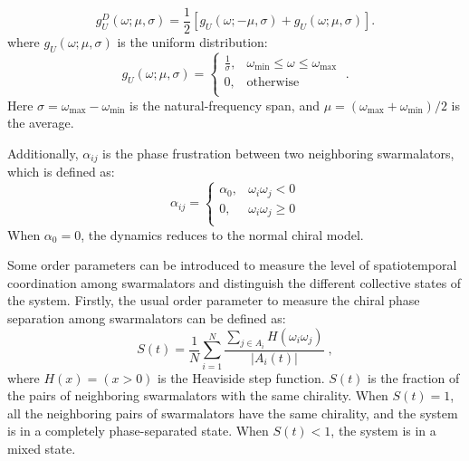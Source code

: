 \documentclass{article}
\begin{document}
\begin{equation}
    g_U^{D}\left( \omega ;\mu,\sigma\right) 
    =\frac{1}{2}\left [
    g_U\left( \omega ;-\mu,\sigma\right) + 
    g_U\left( \omega ; \mu,\sigma\right) \right ].
    \label{eq:uniform2}
\end{equation}
where $g_U\left( \omega ;\mu ,\sigma \right)$ is the uniform distribution:
\begin{equation}
    g_U\left( \omega ;\mu ,\sigma \right) =\begin{cases}
	\frac{1}{\sigma},&		\omega _{\min}\leqslant \omega \leqslant \omega _{\max}\\
	0,&		\mathrm{otherwise}\\
\end{cases}\;.
\label{eq:uniform}
\end{equation}
Here $\sigma = \omega_{\max}-\omega _{\min}$ is the natural-frequency span, and $\mu = (\omega_{\max}+\omega _{\min})/2$ is the average.

Additionally, $\alpha_{ij}$ is the phase frustration between two neighboring swarmalators, which is defined as:
\begin{equation}
    \alpha _{ij}=\begin{cases}
        \alpha _0,&		\omega _i\omega _j<0\\
        0,&		\omega _i\omega _j\geqslant 0\\
    \end{cases}
\end{equation}
When $\alpha_0=0$, the dynamics reduces to the normal chiral model.

Some order parameters can be introduced to measure the level of spatiotemporal coordination among swarmalators and distinguish the different collective states of the system. Firstly, the usual order parameter to measure the chiral phase separation among swarmalators can be defined as:
\begin{equation}
    S\left( t \right) =\frac{1}{N}\sum_{i=1}^N{\frac{\sum_{j\in A_i}{H\left( \omega _i\omega _j \right)}}{\left| A_i\left( t \right) \right|}}\;,
\end{equation}
where $H\left( x \right) =\left( x>0 \right)$ is the Heaviside step function. $S\left( t \right)$ is the fraction of the pairs of neighboring swarmalators with the same chirality. When $S\left( t \right)=1$, all the neighboring pairs of swarmalators have the same chirality, and the system is in a completely phase-separated state. When $S\left( t \right)< 1$, the system is in a mixed state.
\end{document}
